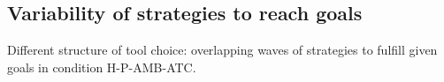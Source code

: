 \documentclass[10pt,letterpaper]{article}
\begin{document}
	
	\subsection{Variability of strategies to reach goals}
	
		Different structure of tool choice: overlapping waves of strategies to fulfill given goals in condition H-P-AMB-ATC.
	
	
%






\setlength{\bibleftmargin}{.125in}
\setlength{\bibindent}{-\bibleftmargin}


\end{document}
